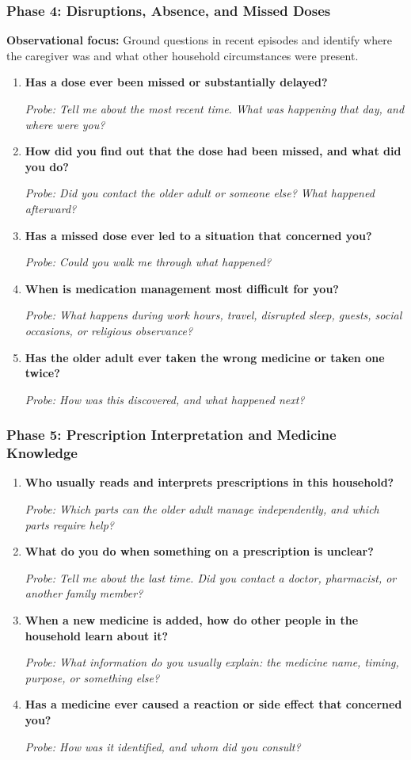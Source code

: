 \subsubsection{Phase 4: Disruptions, Absence, and Missed Doses}

\textbf{Observational focus:} Ground questions in recent episodes and identify where the caregiver was and what other household circumstances were present.

\begin{enumerate}[resume]
  \item \textbf{Has a dose ever been missed or substantially delayed?}

  \textit{Probe: Tell me about the most recent time. What was happening that day, and where were you?}
  \item \textbf{How did you find out that the dose had been missed, and what did you do?}

  \textit{Probe: Did you contact the older adult or someone else? What happened afterward?}
  \item \textbf{Has a missed dose ever led to a situation that concerned you?}

  \textit{Probe: Could you walk me through what happened?}
  \item \textbf{When is medication management most difficult for you?}

  \textit{Probe: What happens during work hours, travel, disrupted sleep, guests, social occasions, or religious observance?}
  \item \textbf{Has the older adult ever taken the wrong medicine or taken one twice?}

  \textit{Probe: How was this discovered, and what happened next?}
\end{enumerate}

\subsubsection{Phase 5: Prescription Interpretation and Medicine Knowledge}

\begin{enumerate}[resume]
  \item \textbf{Who usually reads and interprets prescriptions in this household?}

  \textit{Probe: Which parts can the older adult manage independently, and which parts require help?}
  \item \textbf{What do you do when something on a prescription is unclear?}

  \textit{Probe: Tell me about the last time. Did you contact a doctor, pharmacist, or another family member?}
  \item \textbf{When a new medicine is added, how do other people in the household learn about it?}

  \textit{Probe: What information do you usually explain: the medicine name, timing, purpose, or something else?}
  \item \textbf{Has a medicine ever caused a reaction or side effect that concerned you?}

  \textit{Probe: How was it identified, and whom did you consult?}
\end{enumerate}

